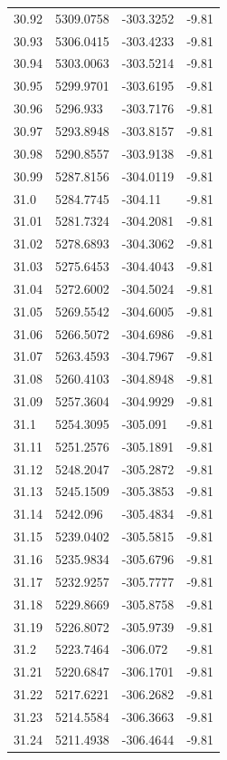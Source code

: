 \begin{table}[H]
\begin{tabular}{llll}
30.92 & 5309.0758 & -303.3252 & -9.81 \\
30.93 & 5306.0415 & -303.4233 & -9.81 \\
30.94 & 5303.0063 & -303.5214 & -9.81 \\
30.95 & 5299.9701 & -303.6195 & -9.81 \\
30.96 & 5296.933 & -303.7176 & -9.81 \\
30.97 & 5293.8948 & -303.8157 & -9.81 \\
30.98 & 5290.8557 & -303.9138 & -9.81 \\
30.99 & 5287.8156 & -304.0119 & -9.81 \\
31.0 & 5284.7745 & -304.11 & -9.81 \\
31.01 & 5281.7324 & -304.2081 & -9.81 \\
31.02 & 5278.6893 & -304.3062 & -9.81 \\
31.03 & 5275.6453 & -304.4043 & -9.81 \\
31.04 & 5272.6002 & -304.5024 & -9.81 \\
31.05 & 5269.5542 & -304.6005 & -9.81 \\
31.06 & 5266.5072 & -304.6986 & -9.81 \\
31.07 & 5263.4593 & -304.7967 & -9.81 \\
31.08 & 5260.4103 & -304.8948 & -9.81 \\
31.09 & 5257.3604 & -304.9929 & -9.81 \\
31.1 & 5254.3095 & -305.091 & -9.81 \\
31.11 & 5251.2576 & -305.1891 & -9.81 \\
31.12 & 5248.2047 & -305.2872 & -9.81 \\
31.13 & 5245.1509 & -305.3853 & -9.81 \\
31.14 & 5242.096 & -305.4834 & -9.81 \\
31.15 & 5239.0402 & -305.5815 & -9.81 \\
31.16 & 5235.9834 & -305.6796 & -9.81 \\
31.17 & 5232.9257 & -305.7777 & -9.81 \\
31.18 & 5229.8669 & -305.8758 & -9.81 \\
31.19 & 5226.8072 & -305.9739 & -9.81 \\
31.2 & 5223.7464 & -306.072 & -9.81 \\
31.21 & 5220.6847 & -306.1701 & -9.81 \\
31.22 & 5217.6221 & -306.2682 & -9.81 \\
31.23 & 5214.5584 & -306.3663 & -9.81 \\
31.24 & 5211.4938 & -306.4644 & -9.81 \\

\end{tabular}
\end{table}
